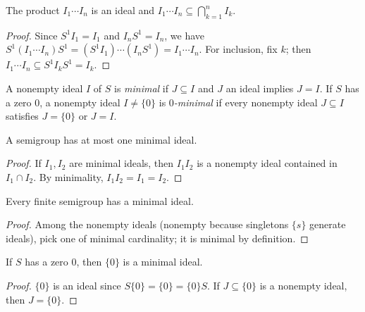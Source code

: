 \begin{lemma}
\label{lem:product-ideal-in-intersection}
The product \(I_1\cdots I_n\) is an ideal and \(I_1\cdots I_n\subseteq \bigcap_{k=1}^n I_k\).
\end{lemma}
\begin{proof}
Since \(S^1 I_1=I_1\) and \(I_n S^1=I_n\), we have \(S^1(I_1\cdots I_n)S^1=(S^1 I_1)\cdots (I_n S^1)=I_1\cdots I_n\). For inclusion, fix \(k\); then \(I_1\cdots I_n\subseteq S^1 I_k S^1=I_k\).
\end{proof}

\begin{definition}
\label{def:minimal-ideal}
A nonempty ideal \(I\) of \(S\) is \emph{minimal} if \(J\subseteq I\) and \(J\) an ideal implies \(J=I\). If \(S\) has a zero \(0\), a nonempty ideal \(I\ne \{0\}\) is \emph{\(0\)-minimal} if every nonempty ideal \(J\subseteq I\) satisfies \(J=\{0\}\) or \(J=I\).
\end{definition}

\begin{lemma}
\label{lem:at-most-one-minimal-ideal}
A semigroup has at most one minimal ideal.
\end{lemma}
\begin{proof}
If \(I_1,I_2\) are minimal ideals, then \(I_1 I_2\) is a nonempty ideal contained in \(I_1\cap I_2\). By minimality, \(I_1 I_2=I_1=I_2\).
\end{proof}

\begin{lemma}
\label{lem:finite-semigroup-has-minimal-ideal}
Every finite semigroup has a minimal ideal.
\end{lemma}
\begin{proof}
Among the nonempty ideals (nonempty because singletons \(\{s\}\) generate ideals), pick one of minimal cardinality; it is minimal by definition.
\end{proof}

\begin{lemma}
\label{lem:zero-gives-minimal-ideal}
If \(S\) has a zero \(0\), then \(\{0\}\) is a minimal ideal.
\end{lemma}
\begin{proof}
\(\{0\}\) is an ideal since \(S\{0\}=\{0\}=\{0\}S\). If \(J\subseteq \{0\}\) is a nonempty ideal, then \(J=\{0\}\).
\end{proof}

